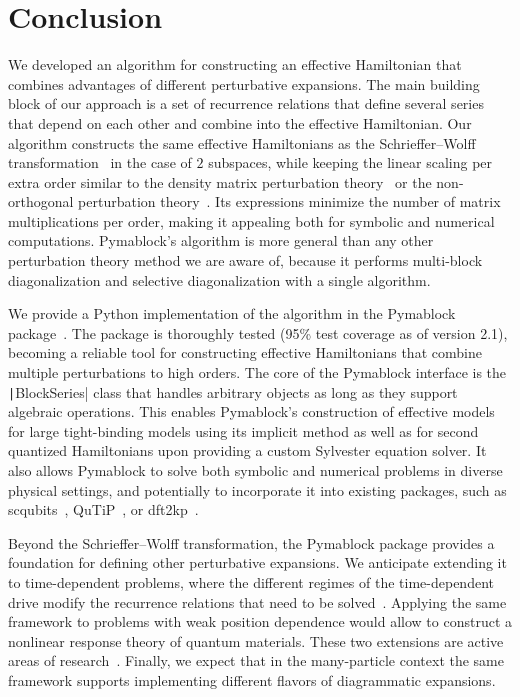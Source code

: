 \section{Conclusion}

We developed an algorithm for constructing an effective Hamiltonian that combines advantages of different perturbative expansions.
The main building block of our approach is a set of recurrence relations that define several series that depend on each other and combine into the effective Hamiltonian.
Our algorithm constructs the same effective Hamiltonians as the Schrieffer--Wolff transformation~\cite{Schrieffer_1966} in the case of $2$ subspaces, while keeping the linear scaling per extra order similar to the density matrix perturbation theory~\cite{McWeeny_1962, Truflandier_2020} or the non-orthogonal perturbation theory~\cite{Bloch_1958}.
Its expressions minimize the number of matrix multiplications per order, making it appealing both for symbolic and numerical computations.
Pymablock's algorithm is more general than any other perturbation theory method we are aware of, because it performs multi-block diagonalization and selective diagonalization with a single algorithm.

We provide a Python implementation of the algorithm in the Pymablock package~\cite{Araya_2024}.
The package is thoroughly tested (95\% test coverage as of version 2.1), becoming a reliable tool for constructing effective Hamiltonians that combine multiple perturbations to high orders.
The core of the Pymablock interface is the \texttt|BlockSeries| class that handles arbitrary objects as long as they support algebraic operations.
This enables Pymablock's construction of effective models for large tight-binding models using its implicit method as well as for second quantized Hamiltonians upon providing a custom Sylvester equation solver.
It also allows Pymablock to solve both symbolic and numerical problems in diverse physical settings, and potentially to incorporate it into existing packages, such as scqubits~\cite{Groszkowski_2021}, QuTiP~\cite{Johansson_2012,Johansson_2013}, or dft2kp~\cite{Cassiano_2024}.

Beyond the Schrieffer--Wolff transformation, the Pymablock package provides a foundation for defining other perturbative expansions.
We anticipate extending it to time-dependent problems, where the different regimes of the time-dependent drive modify the recurrence relations that need to be solved~\cite{Rodriguez-Vega_2018,Malekakhlagh_2020}.
Applying the same framework to problems with weak position dependence would allow to construct a nonlinear response theory of quantum materials.
These two extensions are active areas of research~\cite{Motzoi_2009,Theis_2018,Bernevig_2021,Venkatraman_2022,Xu_2024b, Reascos_2024}.
Finally, we expect that in the many-particle context the same framework supports implementing different flavors of diagrammatic expansions.
